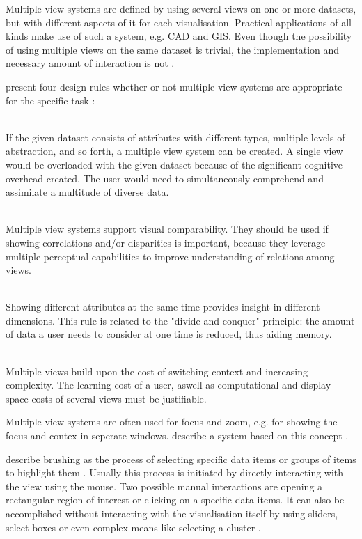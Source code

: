 Multiple view systems are defined by using several views on one or more datasets, but with different aspects of it for each visualisation. Practical applications of all kinds make use of such a system, e.g. \ac{CAD} and \ac{GIS}. Even though the possibility of using multiple views on the same dataset is trivial, the implementation and necessary amount of interaction is not .

\citeauthor{Baldonado2000} present four design rules whether or not multiple view systems are appropriate for the specific task :

\begin{enumerate}

 \hfill \\
If the given dataset consists of attributes with different types, multiple levels of abstraction, and so forth, a multiple view system can be created. A single view would be overloaded with the given dataset because of the significant cognitive overhead created. The user would need to simultaneously comprehend and assimilate a multitude of diverse data.

 \hfill \\
Multiple view systems support visual comparability. They should be used if showing correlations and/or disparities is important, because they leverage multiple perceptual capabilities to improve understanding of relations among views.

 \hfill \\
Showing different attributes at the same time provides insight in different dimensions. This rule is related to the "divide and conquer" principle: the amount of data a user needs to consider at one time is reduced, thus aiding memory.

 \hfill \\
Multiple views build upon the cost of switching context and increasing complexity. The learning cost of a user, aswell as computational and display space costs of several views must be justifiable.

\end{enumerate}

Multiple view systems are often used for focus and zoom, e.g. for showing the focus and contex in seperate windows. \citeauthor{Robert:1998} describe a system based on this concept .

\citeauthor{Martin:1995} describe brushing as the process of selecting specific data items or groups of items to highlight them . Usually this process is initiated by directly interacting with the view using the mouse. Two possible manual interactions are opening a rectangular region of interest or clicking on a specific data items. It can also be accomplished without interacting with the visualisation itself by using sliders, select-boxes or even complex means like selecting a cluster .

